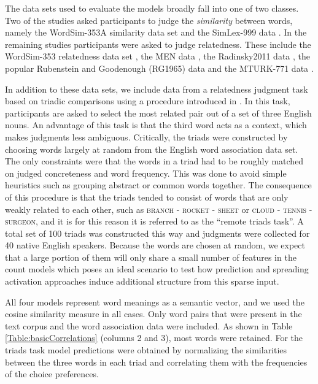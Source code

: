 \documentclass{article}
\newcommand{\stimulus}[1]{\textsc{#1}}
\begin{document}
The data sets used to evaluate the models broadly fall into one of two classes. Two of the studies asked participants to judge the {\it similarity} between words, namely the WordSim-353A similarity data set \cite{AgirreAlfonseca2009} and the SimLex-999 data \cite{Hill2016simlex}. In the remaining studies participants were asked to judge relatedness. These include the WordSim-353 relatedness data set \cite{AgirreAlfonseca2009}, the MEN data \cite{BruniBoleda2012}, the Radinsky2011 data \cite{RadinskyAgichtein2011}, the popular Rubenstein and Goodenough (RG1965) data \cite{Rubenstein1965} and the MTURK-771 data \cite{HalawiDror2012}.

In addition to these data sets, we include data from a relatedness judgment task based on triadic comparisons using a procedure introduced in \cite{DeDeyne2016JEP}. In this task, participants are asked to select the most related pair out of a set of three English nouns. An advantage of this task is that the third word acts as a context, which makes judgments less ambiguous. Critically, the triads were constructed by choosing words largely at random from the English word association data set. The only constraints were that the words in a triad had to be roughly matched on judged concreteness and word frequency. This was done to avoid simple heuristics such as grouping abstract or common words together.  The consequence of this procedure is that the triads tended to consist of words that are only weakly related to each other, such as  \stimulus{branch} - \stimulus{rocket} - \stimulus{sheet} or \stimulus{cloud} - \stimulus{tennis} - \stimulus{surgeon}, and it is for this reason it is referred to as the ``remote triads task''. A total set of 100 triads was constructed this way and judgments were collected for 40 native English speakers.
Because the words are chosen at random, we expect that a large portion of them will only share a small number of features in the count models which poses an ideal scenario to test how prediction and spreading activation approaches induce additional structure from this sparse input.

All four models represent word meanings as a semantic vector, and we used the cosine similarity measure in all cases. Only word pairs that were present in the text corpus and the word association data were included. As shown in Table  \ref{Table:basicCorrelations} (columns 2 and 3), most words were retained. For the triads task model predictions were  obtained by normalizing the similarities between the three words in each triad and correlating them with the frequencies of the choice preferences.
\end{document}
